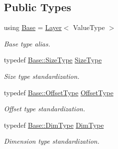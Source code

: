 \subsection*{Public Types}
\begin{DoxyCompactItemize}
\item 
using \hyperlink{classffnn_1_1layer_1_1_input_a7d3eef885863ffbab29a2dba5b9d6e2a}{Base} = \hyperlink{classffnn_1_1layer_1_1_layer}{Layer}$<$ Value\-Type $>$
\begin{DoxyCompactList}\small\item\em Base type alias. \end{DoxyCompactList}\item 
typedef \hyperlink{classffnn_1_1layer_1_1_layer_aeccac281d4220fab9cebf78b004c09d1}{Base\-::\-Size\-Type} \hyperlink{classffnn_1_1layer_1_1_input_a0d5acc89e0b0ad61f148c18325fb46f4}{Size\-Type}
\begin{DoxyCompactList}\small\item\em Size type standardization. \end{DoxyCompactList}\item 
typedef \hyperlink{classffnn_1_1layer_1_1_layer_a0e35ffd6e0657856f3a75323b2db9fcb}{Base\-::\-Offset\-Type} \hyperlink{classffnn_1_1layer_1_1_input_af8249b647f4c1d4404ae98741b1686e1}{Offset\-Type}
\begin{DoxyCompactList}\small\item\em Offset type standardization. \end{DoxyCompactList}\item 
typedef \hyperlink{classffnn_1_1layer_1_1_layer_a104a0f51427df4e03f4ac9e1ce7f6083}{Base\-::\-Dim\-Type} \hyperlink{classffnn_1_1layer_1_1_input_aac96fcbfd3e10e7f5b1d7244e66e4399}{Dim\-Type}
\begin{DoxyCompactList}\small\item\em Dimension type standardization. \end{DoxyCompactList}\end{DoxyCompactItemize}
